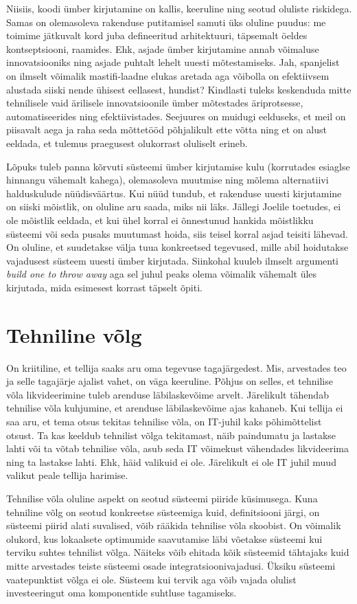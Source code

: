 \documentclass{tufte-book}
\begin{document}
Niisiis, koodi ümber kirjutamine on kallis, keeruline ning seotud oluliste riskidega. Samas on olemasoleva rakenduse putitamisel samuti üks oluline puudus: me toimime jätkuvalt kord juba defineeritud arhitektuuri, täpsemalt öeldes kontseptsiooni, raamides. Ehk, asjade ümber kirjutamine annab võimaluse innovatsiooniks ning asjade puhtalt lehelt uuesti mõtestamiseks. Jah, spanjelist on ilmselt võimalik mastifi-laadne elukas aretada aga võibolla on efektiivsem alustada siiski nende ühisest eellasest, hundist? Kindlasti tuleks keskenduda mitte tehnilisele vaid ärilisele innovatsioonile ümber mõtestades äriprotsesse, automatiseerides ning efektiivistades. Seejuures on muidugi eelduseks, et meil on piisavalt aega ja raha seda mõttetööd põhjalikult ette võtta ning et on alust eeldada, et tulemus praegusest olukorrast oluliselt erineb.

Lõpuks tuleb panna kõrvuti süsteemi ümber kirjutamise kulu (korrutades esiaglse hinnangu vähemalt kahega), olemasoleva muutmise ning mõlema alternatiivi halduskulude nüüdisväärtus. Kui nüüd tundub, et rakenduse uuesti kirjutamine on siiski mõistlik, on oluline aru saada, miks nii läks. Jällegi Joelile toetudes, ei ole mõistlik eeldada, et kui ühel korral ei õnnestunud hankida mõistlikku süsteemi või seda pusaks muutumast hoida, siis teisel korral asjad teisiti lähevad. On oluline, et suudetakse välja tuua konkreetsed tegevused, mille abil hoidutakse vajadusest süsteem uuesti ümber kirjutada. Siinkohal kuuleb ilmselt argumenti \emph{build one to throw away} aga sel juhul peaks olema võimalik vähemalt üles kirjutada, mida esimesest korrast täpselt õpiti.

\section{Tehniline võlg}
On kriitiline, et tellija saaks aru oma tegevuse tagajärgedest. Mis, arvestades teo ja selle tagajärje ajalist vahet, on väga keeruline. Põhjus on selles, et tehnilise võla likvideerimine tuleb arenduse läbilaskevõime arvelt. Järelikult tähendab tehnilise võla kuhjumine, et arenduse läbilaskevõime ajas kahaneb. Kui tellija ei saa aru, et tema otsus tekitas tehnilise võla, on IT-juhil kaks põhimõttelist otsust. Ta kas keeldub tehnilist võlga tekitamast, näib paindumatu ja lastakse lahti või ta võtab tehnilise võla, asub seda IT võimekust vähendades likvideerima ning ta lastakse lahti. Ehk, häid valikuid ei ole. Järelikult ei ole IT juhil muud valikut peale tellija harimise.

Tehnilise võla oluline aspekt on seotud süsteemi piiride küsimusega. Kuna tehniline võlg on seotud konkreetse süsteemiga kuid, definitsiooni järgi, on süsteemi piirid alati suvalised, võib rääkida tehnilise võla skoobist. On võimalik olukord, kus lokaalsete optimumide saavutamise läbi võetakse süsteemi kui terviku suhtes tehnilist võlga. Näiteks võib ehitada kõik süsteemid tähtajaks kuid mitte arvestades teiste süsteemi osade integratsioonivajadusi. Üksiku süsteemi vaatepunktist võlga ei ole. Süsteem kui tervik aga võib vajada olulist investeeringut oma komponentide suhtluse tagamiseks. 
\end{document}
